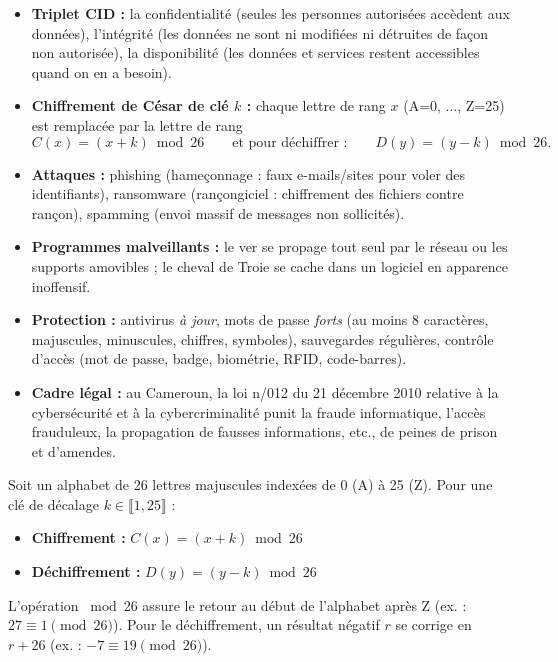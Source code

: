 \documentclass[11pt]{article}
\newcommand{\cle}[1]{{\popxbold\color{popdark}#1}}
\begin{document}
\begin{aretenir}
\begin{itemize}
  \item \textbf{Triplet CID :} la \cle{confidentialité} (seules les personnes autorisées accèdent aux données), l'\cle{intégrité} (les données ne sont ni modifiées ni détruites de façon non autorisée), la \cle{disponibilité} (les données et services restent accessibles quand on en a besoin).
  \item \textbf{Chiffrement de César de clé $k$ :} chaque lettre de rang $x$ (A=0, ..., Z=25) est remplacée par la lettre de rang
  \[ C(x) = (x + k) \bmod 26 \qquad \text{et pour déchiffrer :} \qquad D(y) = (y - k) \bmod 26. \]
  \item \textbf{Attaques :} \cle{phishing} (hameçonnage : faux e-mails/sites pour voler des identifiants), \cle{ransomware} (rançongiciel : chiffrement des fichiers contre rançon), \cle{spamming} (envoi massif de messages non sollicités).
  \item \textbf{Programmes malveillants :} le \cle{ver} se propage tout seul par le réseau ou les supports amovibles ; le \cle{cheval de Troie} se cache dans un logiciel en apparence inoffensif.
  \item \textbf{Protection :} antivirus \emph{à jour}, mots de passe \emph{forts} (au moins 8 caractères, majuscules, minuscules, chiffres, symboles), sauvegardes régulières, contrôle d'accès (mot de passe, badge, biométrie, RFID, code-barres).
  \item \textbf{Cadre légal :} au Cameroun, la loi n/012 du 21 décembre 2010 relative à la cybersécurité et à la cybercriminalité punit la fraude informatique, l'accès frauduleux, la propagation de fausses informations, etc., de peines de prison et d'amendes.
\end{itemize}
\end{aretenir}

\begin{propriete}
Soit un alphabet de 26 lettres majuscules indexées de 0 (A) à 25 (Z). Pour une clé de décalage $k \in \llbracket 1, 25 \rrbracket$ :
\begin{itemize}
  \item \textbf{Chiffrement :} $C(x) = (x + k) \bmod 26$
  \item \textbf{Déchiffrement :} $D(y) = (y - k) \bmod 26$
\end{itemize}
L'opération $\bmod 26$ assure le retour au début de l'alphabet après Z (ex. : $27 \equiv 1 \pmod{26}$). Pour le déchiffrement, un résultat négatif $r$ se corrige en $r + 26$ (ex. : $-7 \equiv 19 \pmod{26}$).
\end{propriete}
\end{document}
